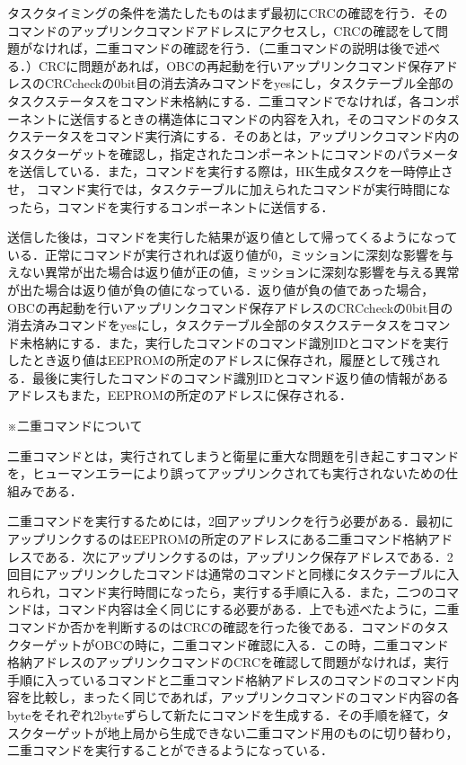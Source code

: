 \begin{enumerate}
	タスクタイミングの条件を満たしたものはまず最初にCRCの確認を行う．そのコマンドのアップリンクコマンドアドレスにアクセスし，CRCの確認をして問題がなければ，二重コマンドの確認を行う．（二重コマンドの説明は後で述べる．）CRCに問題があれば，OBCの再起動を行いアップリンクコマンド保存アドレスのCRCcheckの0bit目の消去済みコマンドをyesにし，タスクテーブル全部のタスクステータスをコマンド未格納にする．二重コマンドでなければ，各コンポーネントに送信するときの構造体にコマンドの内容を入れ，そのコマンドのタスクステータスをコマンド実行済にする．そのあとは，アップリンクコマンド内のタスクターゲットを確認し，指定されたコンポーネントにコマンドのパラメータを送信している．また，コマンドを実行する際は，HK生成タスクを一時停止させ，	コマンド実行では，タスクテーブルに加えられたコマンドが実行時間になったら，コマンドを実行するコンポーネントに送信する．\par
	送信した後は，コマンドを実行した結果が返り値として帰ってくるようになっている．正常にコマンドが実行されれば返り値が0，ミッションに深刻な影響を与えない異常が出た場合は返り値が正の値，ミッションに深刻な影響を与える異常が出た場合は返り値が負の値になっている．返り値が負の値であった場合，OBCの再起動を行いアップリンクコマンド保存アドレスのCRCcheckの0bit目の消去済みコマンドをyesにし，タスクテーブル全部のタスクステータスをコマンド未格納にする．また，実行したコマンドのコマンド識別IDとコマンドを実行したとき返り値はEEPROMの所定のアドレスに保存され，履歴として残される．最後に実行したコマンドのコマンド識別IDとコマンド返り値の情報があるアドレスもまた，EEPROMの所定のアドレスに保存される．
	
	\par ※二重コマンドについて\par
	二重コマンドとは，実行されてしまうと衛星に重大な問題を引き起こすコマンドを，ヒューマンエラーにより誤ってアップリンクされても実行されないための仕組みである．\par
	二重コマンドを実行するためには，2回アップリンクを行う必要がある．最初にアップリンクするのはEEPROMの所定のアドレスにある二重コマンド格納アドレスである．次にアップリンクするのは，アップリンク保存アドレスである．2回目にアップリンクしたコマンドは通常のコマンドと同様にタスクテーブルに入れられ，コマンド実行時間になったら，実行する手順に入る．また，二つのコマンドは，コマンド内容は全く同じにする必要がある．上でも述べたように，二重コマンドか否かを判断するのはCRCの確認を行った後である．コマンドのタスクターゲットがOBCの時に，二重コマンド確認に入る．この時，二重コマンド格納アドレスのアップリンクコマンドのCRCを確認して問題がなければ，実行手順に入っているコマンドと二重コマンド格納アドレスのコマンドのコマンド内容を比較し，まったく同じであれば，アップリンクコマンドのコマンド内容の各byteをそれぞれ2byteずらして新たにコマンドを生成する．その手順を経て，タスクターゲットが地上局から生成できない二重コマンド用のものに切り替わり，二重コマンドを実行することができるようになっている．	

\end{enumerate}
